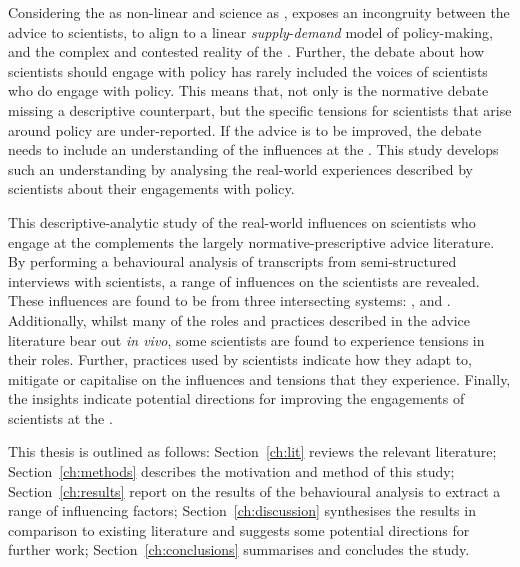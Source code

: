 Considering the \SPI{} as non-linear and \CAN{} science as \PNS, exposes an incongruity between the advice to scientists, to align to a linear \emph{supply}-\emph{demand} model of policy-making, and the complex and contested reality of the \CAN{} \SPI. Further, the debate about how scientists should engage with policy has rarely included the voices of scientists who do engage with policy. This means that, not only is the normative debate missing a descriptive counterpart, but the specific tensions for scientists that arise around \CAN{} policy are under-reported. If the advice is to be improved, the debate needs to include an understanding of the influences at the \CAN{} \SPI. This study develops such an understanding by analysing the real-world experiences described by \CAN{} scientists about their engagements with policy.

This descriptive-analytic study of the real-world influences on scientists who engage at the \CAN{} \SPI complements the largely normative-prescriptive advice literature. By performing a behavioural analysis of transcripts from semi-structured interviews with scientists, a range of influences on the scientists are revealed. These influences are found to be from three intersecting systems: \inte, \know{} and \scip. Additionally, whilst many of the roles and practices described in the advice literature bear out \emph{in vivo}, some scientists are found to experience tensions in their roles. Further, practices used by scientists indicate how they adapt to, mitigate or capitalise on the influences and tensions that they experience. Finally, the insights indicate potential directions for improving the engagements of scientists at the \CAN{} \SPI.

This thesis is outlined as follows: Section~\ref{ch:lit} reviews the relevant literature; Section~\ref{ch:methods} describes the motivation and method of this study; Section~\ref{ch:results} report on the results of the behavioural analysis to extract a range of influencing factors; Section~\ref{ch:discussion} synthesises the results in comparison to existing literature and suggests some potential directions for further work; Section~\ref{ch:conclusions} summarises and concludes the study.

